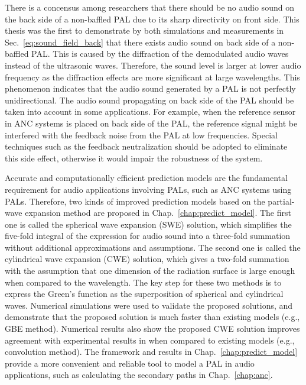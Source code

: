 {
    There is a concensus among researchers that there should be no audio sound on the back side of a non-baffled PAL due to its sharp directivity on front side.
    This thesis was the first to demonstrate by both simulations and measurements in Sec.~\ref{eq:sound_field_back} that there exists audio sound on back side of a non-baffled PAL.
    This is caused by the diffraction of the demodulated audio waves instead of the ultrasonic waves.
    Therefore, the sound level is larger at lower audio frequency as the diffraction effects are more significant at large wavelengths.
    This phenomenon indicates that the audio sound generated by a PAL is not perfectly unidirectional. 
    The audio sound propagating on back side of the PAL should be taken into account in some applications.
    For example, when the reference sensor in ANC systems is placed on back side of the PAL, the reference signal might be interfered with the feedback noise from the PAL at low frequencies.
    Special techniques such as the feedback neutralization \cite{Akhtar2007ActiveNoiseControl, Akhtar2007AcousticFeedbackNeutralization} should be adopted to eliminate this side effect, otherwise it would impair the robustness of the system.
}

{
Accurate and computationally efficient prediction models are the fundamental requirement for audio applications involving PALs, such as ANC systems using PALs.
Therefore, two kinds of improved prediction models based on the partial-wave expansion method are proposed in Chap.~\ref{chap:predict_model}.
The first one is called the spherical wave expansion (SWE) solution, which simplifies the five-fold integral of the expression for audio sound into a three-fold summation without additional approximations and assumptions.
The second one is called the cylindrical wave expansion (CWE) solution, which gives a two-fold summation with the assumption that one dimension of the radiation surface is large enough when compared to the wavelength.
The key step for these two methods is to express the Green's function as the superposition of spherical and cylindrical waves.
Numerical simulations were used to validate the proposed solutions, and demonstrate that the proposed solution is much faster than existing models (e.g., GBE method).
Numerical results also show the proposed CWE solution improves agreement with experimental results in \cite{Shi2015ConvolutionModelComputing} when compared to existing models (e.g., convolution method).
The framework and results in Chap.~\ref{chap:predict_model} provide a more convenient and reliable tool to model a PAL in audio applications, such as calculating the secondary paths in Chap.~\ref{chap:anc}.
}

